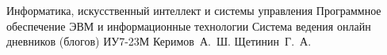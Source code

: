 \documentclass{bmstu-gost-7-32}
\begin{document}
\makecourseworktitle
	{Информатика, искусственный интеллект и системы управления} %
	{Программное обеспечение ЭВМ и информационные технологии} %
	{Система ведения онлайн дневников (блогов)} %
	{ИУ7-23М} %
	{Керимов~А.~Ш.} %
	{Щетинин~Г.~А.} %
	{} %
	{} %

%
\setcounter{page}{3}
%
%

%
%


\begin{MainPart}
	
	
	
\end{MainPart}



%
\end{document}
